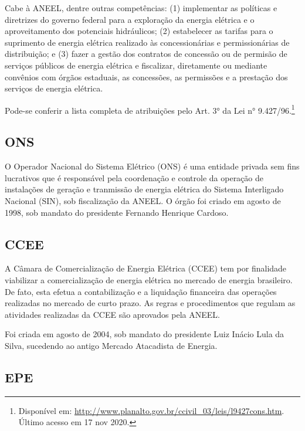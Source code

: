 \documentclass[grad,numbers]{coppe}
\begin{document}
  Cabe à ANEEL, dentre outras competências: (1) implementar as políticas e diretrizes do governo federal para a exploração da energia elétrica e o aproveitamento dos potenciais hidráulicos; (2) estabelecer as tarifas para o suprimento de energia elétrica realizado às concessionárias e permissionárias de distribuição; e (3) fazer a gestão dos contratos de concessão ou de permisão de serviços públicos de energia elétrica e fiscalizar, diretamente ou mediante convênios com órgãos estaduais, as concessões, as permissões e a prestação dos serviços de energia elétrica.

  Pode-se conferir a lista completa de atribuições pelo Art. 3° da Lei n° 9.427/96.\footnote{Disponível em: \url{http://www.planalto.gov.br/ccivil_03/leis/l9427cons.htm}. Último acesso em 17 nov 2020.}

  \hypertarget{ons}{%
  \subsection{ONS}\label{ons}}

  O Operador Nacional do Sistema Elétrico (ONS) é uma entidade privada sem fins lucrativos que é responsável pela coordenação e controle da operação de instalações de geração e tranmissão de energia elétrica do Sistema Interligado Nacional (SIN), sob fiscalização da ANEEL. O órgão foi criado em agosto de 1998, sob mandato do presidente Fernando Henrique Cardoso.

  \hypertarget{ccee}{%
  \subsection{CCEE}\label{ccee}}

  A Câmara de Comercialização de Energia Elétrica (CCEE) tem por finalidade viabilizar a comercialização de energia elétrica no mercado de energia brasileiro. De fato, esta efetua a contabilização e a liquidação financeira das operações realizadas no mercado de curto prazo. As regras e procedimentos que regulam as atividades realizadas da CCEE são aprovados pela ANEEL.

  Foi criada em agosto de 2004, sob mandato do presidente Luiz Inácio Lula da Silva, sucedendo ao antigo Mercado Atacadista de Energia.

  \hypertarget{epe}{%
  \subsection{EPE}\label{epe}}
\end{document}

